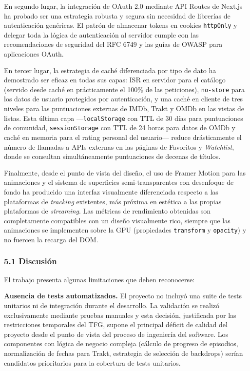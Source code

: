 \documentclass[
]{article}
\begin{document}
En segundo lugar, la integración de OAuth 2.0 mediante API Routes de
Next.js ha probado ser una estrategia robusta y segura sin necesidad de
librerías de autenticación genéricas. El patrón de almacenar tokens en
cookies \texttt{httpOnly} y delegar toda la lógica de autenticación al
servidor cumple con las recomendaciones de seguridad del RFC 6749 y las
guías de OWASP para aplicaciones OAuth.

En tercer lugar, la estrategia de caché diferenciada por tipo de dato ha
demostrado ser eficaz en todas sus capas: ISR en servidor para el
catálogo (servido desde caché en prácticamente el 100\% de las
peticiones), \texttt{no-store} para los datos de usuario protegidos por
autenticación, y una caché en cliente de tres niveles para las
puntuaciones externas de IMDb, Trakt y OMDb en las vistas de listas.
Esta última capa ---\texttt{localStorage} con TTL de 30 días para
puntuaciones de comunidad, \texttt{sessionStorage} con TTL de 24 horas
para datos de OMDb y caché en memoria para el rating personal del
usuario--- reduce drásticamente el número de llamadas a APIs externas en
las páginas de Favoritos y \emph{Watchlist}, donde se consultan
simultáneamente puntuaciones de decenas de títulos.

Finalmente, desde el punto de vista del diseño, el uso de Framer Motion
para las animaciones y el sistema de superficies semi-transparentes con
desenfoque de fondo ha producido una interfaz visualmente diferenciada
respecto a las plataformas de \emph{tracking} existentes, más próxima en
estética a las propias plataformas de \emph{streaming}. Las métricas de
rendimiento obtenidas son completamente compatibles con un diseño
visualmente rico, siempre que las animaciones se implementen sobre la
GPU (propiedades \texttt{transform} y \texttt{opacity}) y no fuercen la
recarga del DOM.

\hypertarget{discusiuxf3n}{%
\subsubsection{5.1 Discusión}\label{discusiuxf3n}}

El trabajo presenta algunas limitaciones que deben reconocerse:

\textbf{Ausencia de tests automatizados.} El proyecto no incluyó una
suite de tests unitarios ni de integración durante el desarrollo. La
validación se realizó exclusivamente mediante pruebas manuales y esta
decisión, justificada por las restricciones temporales del TFG, supone
el principal déficit de calidad del proyecto desde el punto de vista del
proceso de ingeniería del software. Los componentes con lógica de
negocio compleja (cálculo de progreso de episodios, normalización de
fechas para Trakt, estrategia de selección de backdrops) serían
candidatos prioritarios para la cobertura de tests unitarios.
\end{document}
